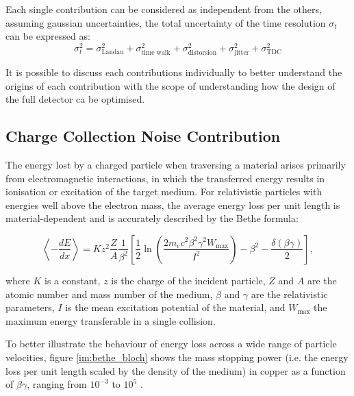 	Each single contribution can be considered as independent from the others, assuming gaussian uncertainties, the total uncertainty of the time resolution $\sigma_t$ can be expressed as: 
	\begin{equation}
		\sigma_t^2 = \sigma_{\text{Landau}}^2 + \sigma_{\text{time walk}}^2 + \sigma_{\text{distorsion}}^2 + \sigma_{\text{jitter}}^2 + \sigma_{\text{TDC}}^2
	\end{equation}
	
	It is possible to discuss each contributions individually to better understand the origins of each contribution with the scope of understanding how the design of the full detector ca be optimised. 
	
	 	\subsection{Charge Collection Noise Contribution}

	 	The energy lost by a charged particle when traversing a material arises primarily from electromagnetic interactions, in which the transferred energy results in ionisation or excitation of the target medium. For relativistic particles with energies well above the electron mass, the average energy loss per unit length is material-dependent and is accurately described by the Bethe formula:

		\begin{equation}
			\left\langle -\frac{dE}{dx} \right\rangle = K z^2 \frac{Z}{A} \frac{1}{\beta^2} \left[ \frac{1}{2} \ln\left( \frac{2 m_e c^2 \beta^2 \gamma^2 W_{\text{max}}}{I^2} \right) - \beta^2 - \frac{\delta(\beta \gamma)}{2} \right],
		\end{equation}

		where $K$ is a constant, $z$ is the charge of the incident particle, $Z$ and $A$ are the atomic number and mass number of the medium, $\beta$ and $\gamma$ are the relativistic parameters, $I$ is the mean excitation potential of the material, and $W_{\text{max}}$ the maximum energy transferable in a single collision.

		To better illustrate the behaviour of energy loss across a wide range of particle velocities, figure \ref{im:bethe_bloch} shows the mass stopping power (i.e. the energy loss per unit length scaled by the density of the medium) in copper as a function of $\beta \gamma$, ranging from $10^{-3}$ to $10^5$ \cite{PDG}.

